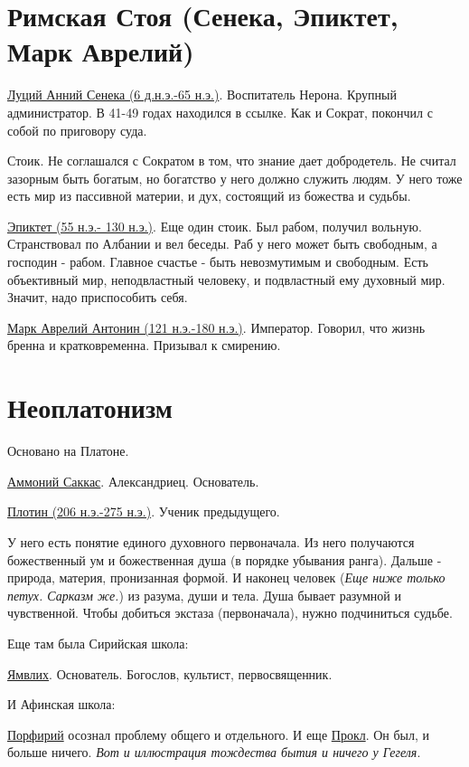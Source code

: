 \documentclass[12pt,a4paper]{article}
\begin{document}
\section{Римская Стоя (Сенека, Эпиктет, Марк Аврелий)}
\hspace{8pt} 
\underline{Луций Анний Сенека  (6 д.н.э.-65 н.э.)}. Воспитатель Нерона. Крупный администратор. В 41-49 годах находился в ссылке. Как и Сократ, покончил с собой по приговору суда.

Стоик. Не соглашался с Сократом в том, что знание дает добродетель. Не считал зазорным быть богатым, но богатство у него должно служить людям. У него тоже есть мир из пассивной материи, и дух, состоящий из божества и судьбы. 

\underline{Эпиктет (55 н.э.- 130 н.э.)}. Еще один стоик. Был рабом, получил вольную. Странствовал по Албании и вел беседы. Раб у него может быть свободным, а господин - рабом. Главное счастье - быть невозмутимым и свободным. Есть объективный мир, неподвластный человеку, и подвластный ему духовный мир. Значит, надо приспособить себя.

\underline{Марк Аврелий Антонин (121 н.э.-180 н.э.)}. Император. Говорил, что жизнь бренна и кратковременна. Призывал к смирению.


\section{Неоплатонизм}

Основано на Платоне.

\underline{Аммоний Саккас}. Александриец. Основатель.

\underline{Плотин (206 н.э.-275 н.э.)}. Ученик предыдущего. 

У него есть понятие единого духовного первоначала. Из него получаются божественный ум и божественная душа (в порядке убывания ранга).  Дальше - природа, материя, пронизанная формой. И наконец человек (\textit{Еще ниже только петух. Сарказм же.}) из разума, души и тела. Душа бывает разумной и чувственной. Чтобы добиться экстаза (первоначала), нужно подчиниться судьбе.

Еще там была Сирийская школа:

\underline{Ямвлих}. Основатель. Богослов, культист, первосвященник. 

И Афинская школа:

\underline{Порфирий} осознал проблему общего и отдельного. И еще \underline{Прокл}. Он был, и больше ничего. \textit{Вот и иллюстрация тождества бытия и ничего у Гегеля}.
\end{document}
